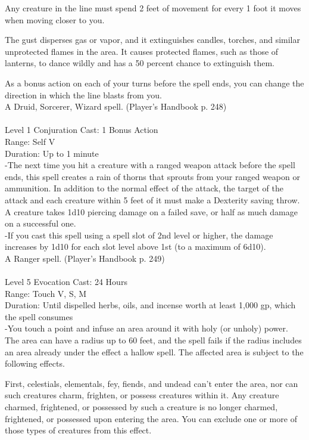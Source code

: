 \documentclass[10pt,twocolumn]{report}
\begin{document}
Any creature in the line must spend 2 feet of movement for every 1 foot it moves when moving closer to you.

The gust disperses gas or vapor, and it extinguishes candles, torches, and similar unprotected flames in the area. It causes protected flames, such as those of lanterns, to dance wildly and has a 50 percent chance to extinguish them.

As a bonus action on each of your turns before the spell ends, you can change the direction in which the line blasts from you.\\
A Druid, Sorcerer, Wizard spell. (Player's Handbook p. 248) \\


 \\
Level 1 \quad Conjuration \quad Cast: 1 Bonus Action\\
Range: Self \quad V\\
Duration: Up to 1 minute \quad \\
-The next time you hit a creature with a ranged weapon attack before the spell ends, this spell creates a rain of thorns that sprouts from your ranged weapon or ammunition. In addition to the normal effect of the attack, the target of the attack and each creature within 5 feet of it must make a Dexterity saving throw. A creature takes 1d10 piercing damage on a failed save, or half as much damage on a successful one.\\
-If you cast this spell using a spell slot of 2nd level or higher, the damage increases by 1d10 for each slot level above 1st (to a maximum of 6d10).\\
A Ranger spell. (Player's Handbook p. 249) \\


 \\
Level 5 \quad Evocation \quad Cast: 24 Hours\\
Range: Touch \quad V, S, M\\
Duration: Until dispelled \quad herbs, oils, and incense worth at least 1,000 gp, which the spell consumes\\
-You touch a point and infuse an area around it with holy (or unholy) power. The area can have a radius up to 60 feet, and the spell fails if the radius includes an area already under the effect a hallow spell. The affected area is subject to the following effects.

First, celestials, elementals, fey, fiends, and undead can’t enter the area, nor can such creatures charm, frighten, or possess creatures within it. Any creature charmed, frightened, or possessed by such a creature is no longer charmed, frightened, or possessed upon entering the area. You can exclude one or more of those types of creatures from this effect.
\end{document}
